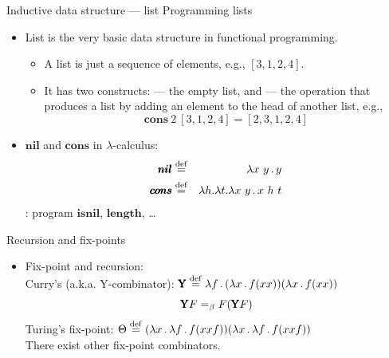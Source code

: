 \documentclass[paper=screen,mode=present,style=zysimple]{powerdot}
\begin{document}
\begin{slide}{Inductive data structure --- list}
Programming lists
\begin{itemize}
\item List is the very basic data structure in functional programming.
\begin{itemize}
\item A list is just a sequence of elements, e.g., $[3, 1, 2, 4]$.
\item It has two constructs:  --- the empty list, 
  and  --- the operation that produces a list by adding an element to 
  the head of another list, e.g., 
\[
\pmb{cons} \ 2 \ [3, 1, 2, 4] = [2, 3, 1, 2, 4]
\]
\end{itemize}
\item $\pmb{nil}$ and $\pmb{cons}$ in $\lambda$-calculus:
\begin{eqnarray*}
\pmb{nil} & \stackrel{\mathrm{def}}{=} & \lambda x \ y \, . \, y \\
\pmb{cons} & \stackrel{\mathrm{def}}{=} & \lambda h . \lambda t . \lambda x \ y \, . \, x \ h \ t
\end{eqnarray*}
: program $\pmb{isnil}$, $\pmb{length}$, \ldots
\end{itemize}
\end{slide}

\begin{slide}{Recursion and fix-points}
\begin{itemize}
\item Fix-point and recursion:
\\[0.2em]
Curry's (a.k.a. $\pmb{\mathrm{Y}}$-combinator): 
$\pmb{\mathrm{Y}} \stackrel{\mathrm{def}}{=} \lambda f \, . \, (\lambda x \, . \, f (x x)) (\lambda x \, . \, f (x x))$
\vspace*{-0.5em}
\[
\pmb{\mathrm Y} F =_\beta F (\pmb{\mathrm Y} F)
\vspace*{-1em}
\]
Turing's fix-point: $\Theta \stackrel{\mathrm{def}}{=} (\lambda x \, . \, \lambda f \, . \, f (x x f)) 
(\lambda x \, . \, \lambda f \, . \, f (x x f))$
\\[0.2em]
There exist other fix-point combinators.
\end{itemize}
\end{slide}
\end{document}
